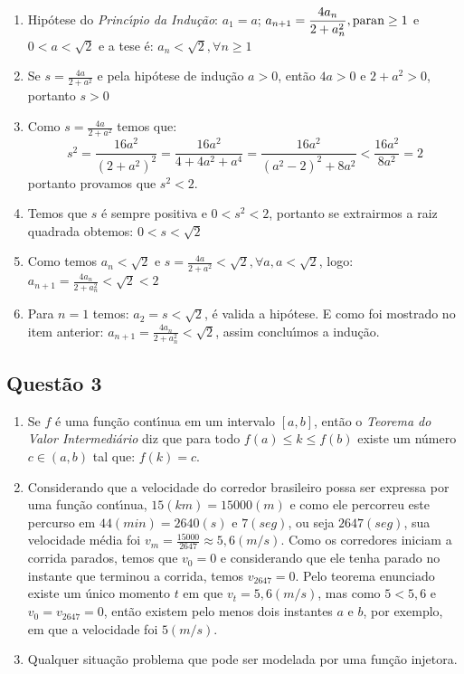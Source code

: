 \begin{enumerate}

\item[(a)] Hip\'otese do {\it Princ\'\i pio da Indu\c c\~ao}: $a_1=a$; $\displaystyle a_{n+1}  = \frac{4a_n}{2+a_n^2}, \rm{para } n\geq 1$ e $0<a<\sqrt{2}$ e a tese \'e: $a_n<\sqrt{2}, \forall n\geq 1$

\item[(b)] Se $\displaystyle s=\frac{4a}{2+a^2}$ e pela hip\'otese de indu\c c\~ao $a>0$, ent\~ao $4a>0$ e $2+a^2>0$, portanto $s>0$

\item[(c)] Como $\displaystyle s=\frac{4a}{2+a^2}$ temos que: $$s^2=\frac{16a^2}{(2+a^2)^2}=\frac{16a^2}{4+4a^2+a^4}=\frac{16a^2}{(a^2-2)^2+8a^2}<\frac{16a^2}{8a^2}=2$$ portanto provamos que $s^2<2$.

\item[(d)] Temos que $s$ \'e sempre positiva e $0<s^2<2$, portanto se extrairmos a raiz quadrada obtemos: $0<s<\sqrt{2}$

\item[(e)] Como temos $a_n<\sqrt 2$ e $s=\displaystyle \frac{4a}{2+a^2}<\sqrt 2, \forall a, a<\sqrt 2$, logo: $a_{n+1}=\displaystyle \frac{4a_n}{2+a_n^2}<\sqrt 2<2$

\item[(f)] Para $n=1$ temos: $a_2=s<\sqrt 2$, \'e valida a hip\'otese. E como foi mostrado no item anterior: $a_{n+1}=\displaystyle \frac{4a_n}{2+a_n^2}<\sqrt 2$, assim conclu\'\i mos a indu\c c\~ao.

\end{enumerate}

\subsection{\color{red} Quest\~ao 3}

\begin{enumerate}

\item[(a)] Se $f$ \'e uma fun\c c\~ao cont\'\i nua em um intervalo $[a,b]$, ent\~ao o {\it Teorema do Valor Intermedi\'ario} diz que para todo $f(a)\leq k \leq f(b)$ existe um n\'umero $c\in (a,b)$ tal que: $f(k)=c$. 

\item[(b)] Considerando que a velocidade do corredor brasileiro possa ser expressa por uma fun\c c\~ao cont\'\i nua, $15 (km)= 15000 (m)$ e como ele percorreu este percurso em $44 (min)= 2640 (s)$ e $7 (seg)$, ou seja $2647 (seg)$, sua velocidade m\'edia foi $\displaystyle v_m= \frac{15000}{2647}\approx 5,6 (m/s)$. Como os corredores iniciam a corrida parados, temos que $v_0=0$ e considerando que ele tenha parado no instante que terminou a corrida, temos $v_{2647}=0$. Pelo teorema enunciado existe um \'unico momento $t$ em que $v_t=5,6 (m/s)$, mas como $5<5,6$ e $v_0=v_{2647}=0$, ent\~ao existem pelo menos dois instantes $a$ e $b$, por exemplo, em que a velocidade foi $5 (m/s)$.

\item[(c)] Qualquer situa\c c\~ao problema que pode ser modelada por uma fun\c c\~ao injetora.

\end{enumerate}

